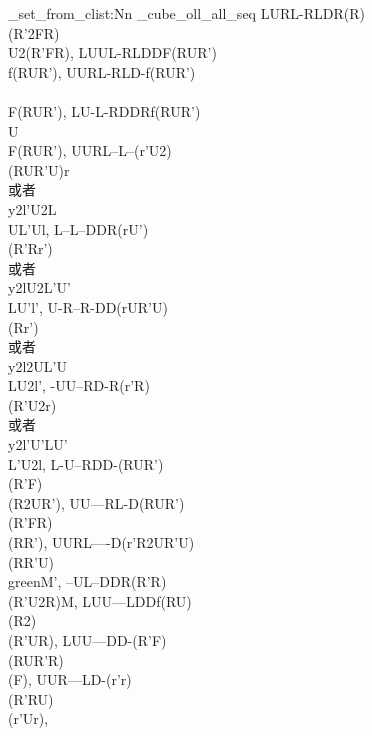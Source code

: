 \documentclass{article}
\begin{document}
\seq_set_from_clist:Nn \g_cube_oll_all_seq {
    {LURL-RLDR}{(R)\\(R'2FR)\\U2(R'FR)}, %
    {LUUL-RLDD}{F(RUR')\\f(RUR')}, %
    {UURL-RLD-}{f(RUR')\\\\F(RUR')}, %
    {LU-L-RDDR}{f(RUR')\\U\\F(RUR')}, %
    {UURL--L--}{(r'U2)\\(RUR'U)r\\或者\\y2l'U2L\\UL'Ul}, %
    {L--L--DDR}{(rU')\\(R'Rr')\\或者\\y2lU2L'U'\\LU'l'}, %
    {U-R--R-DD}{(rUR'U)\\(Rr')\\或者\\y2l2UL'U\\LU2l'}, %
    {-UU--RD-R}{(r'R)\\(R'U2r)\\或者\\y2l'U'LU'\\L'U2l}, %
    {L-U--RDD-}{(RUR')\\(R'F)\\(R2UR')}, %
    {UU---RL-D}{(RUR')\\(R'FR)\\(RR')}, %
    {UURL----D}{(r'R2UR'U)\\(RR'U)\\green{M'}}, %
    {--UL--DDR}{(R'R)\\(R'U2R)M}, %
    {LUU---LDD}{f(RU)\\(R2)\\(R'UR)}, %
    {LUU---DD-}{(R'F)\\(RUR'R)\\(F)}, %
    {UUR---LD-}{(r'r)\\(R'RU)\\(r'Ur)}, %
}
\end{document}
